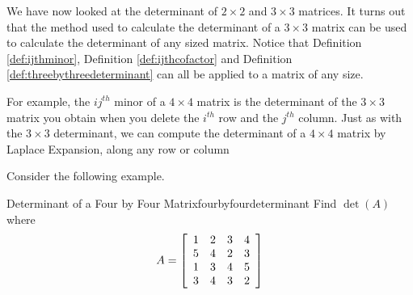 We have now looked at the determinant of $2 \times 2$ and $3 \times 3$ matrices. It turns
out that the method used to calculate the determinant of a $3 \times 3$ matrix 
can be used to calculate the determinant of any sized matrix. Notice that
Definition \ref{def:ijthminor}, Definition \ref{def:ijthcofactor} and Definition \ref{def:threebythreedeterminant}
can all be applied to a matrix of any size. 

For example, the $ij^{th}$ minor of a $4 \times 4$ matrix is the determinant
of the $3 \times 3$ matrix you obtain when you delete the $i^{th}$ row and the $j^{th}$ column. 
Just as with the $3 \times 3$ determinant, we can compute the determinant of a $4 \times 4$ matrix by Laplace Expansion, 
along any row or column

Consider the following example. 

\begin{example}{Determinant of a Four by Four Matrix}{fourbyfourdeterminant}
Find $\det \left( A\right) $ where
\begin{equation*}
A=\left[
\begin{array}{rrrr}
1 & 2 & 3 & 4 \\
5 & 4 & 2 & 3 \\
1 & 3 & 4 & 5 \\
3 & 4 & 3 & 2
\end{array}
\right]
\end{equation*}
\end{example}

